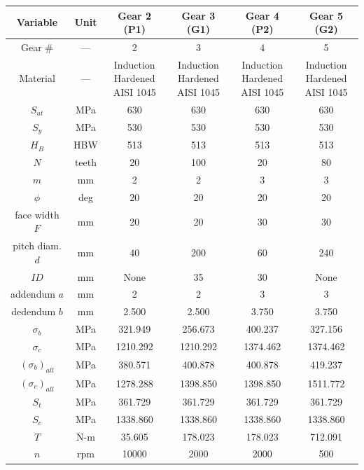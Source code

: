 \begin{tabular}{|c|c|c|c|c|c|}
\hline
Variable & Unit & Gear 2 (P1) & Gear 3 (G1) & Gear 4 (P2) & Gear 5 (G2) \\ \hline

Gear \# & --- & 2 & 3 & 4 & 5 \\ \hline
Material & --- & \makecell{Induction\\Hardened\\AISI 1045} & \makecell{Induction\\Hardened\\AISI 1045} & \makecell{Induction\\Hardened\\AISI 1045} & \makecell{Induction\\Hardened\\AISI 1045} \\ \hline
$S_{ut}$ & MPa & 630 & 630 & 630 & 630 \\ \hline
$S_{y}$ & MPa & 530 & 530 & 530 & 530 \\ \hline
$H_B$ & HBW & 513 & 513 & 513 & 513 \\ \hline
$N$ & teeth & 20 & 100 & 20 & 80 \\ \hline
$m$ & mm & 2 & 2 & 3 & 3 \\ \hline
$\phi$ & deg & 20 & 20 & 20 & 20 \\ \hline
face width $F$ & mm & 20 & 20 & 30 & 30 \\ \hline
pitch diam. $d$ & mm & 40 & 200 & 60 & 240 \\ \hline
$ID$ & mm & None & 35 & 30 & None \\ \hline
addendum $a$ & mm & 2 & 2 & 3 & 3 \\ \hline
dedendum $b$ & mm & 2.500 & 2.500 & 3.750 & 3.750 \\ \hline
$\sigma_b$ & MPa & 321.949 & 256.673 & 400.237 & 327.156 \\ \hline
$\sigma_c$ & MPa & 1210.292 & 1210.292 & 1374.462 & 1374.462 \\ \hline
$(\sigma_b)_{all}$ & MPa & 380.571 & 400.878 & 400.878 & 419.237 \\ \hline
$(\sigma_c)_{all}$ & MPa & 1278.288 & 1398.850 & 1398.850 & 1511.772 \\ \hline
$S_t$ & MPa & 361.729 & 361.729 & 361.729 & 361.729 \\ \hline
$S_c$ & MPa & 1338.860 & 1338.860 & 1338.860 & 1338.860 \\ \hline
$T$ & N-m & 35.605 & 178.023 & 178.023 & 712.091 \\ \hline
$n$ & rpm & 10000 & 2000 & 2000 & 500 \\ \hline

\end{tabular}
